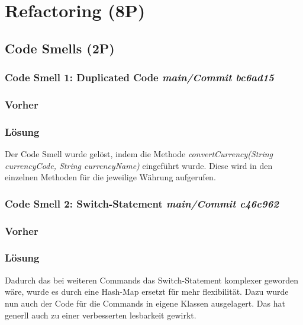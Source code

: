 \section{Refactoring (8P)}
\subsection{Code Smells (2P)}
\subsubsection*{Code Smell 1: Duplicated Code \textit{main/Commit bc6ad15}}
\subsubsection*{Vorher}

\subsubsection*{Lösung}
Der Code Smell wurde gelöst, indem die Methode \textit{convertCurrency(String currencyCode, String currencyName)} eingeführt wurde. Diese wird in den einzelnen Methoden für die jeweilige Währung aufgerufen.



\subsubsection*{Code Smell 2: Switch-Statement \textit{main/Commit c46c962}}
\subsubsection*{Vorher}


\subsubsection*{Lösung}
Dadurch das bei weiteren Commands das Switch-Statement komplexer geworden wäre, wurde es durch eine Hash-Map ersetzt für mehr flexibilität. Dazu wurde nun auch der Code für die Commands in eigene Klassen ausgelagert. Das hat generll auch zu einer verbesserten lesbarkeit gewirkt.

\newpage
